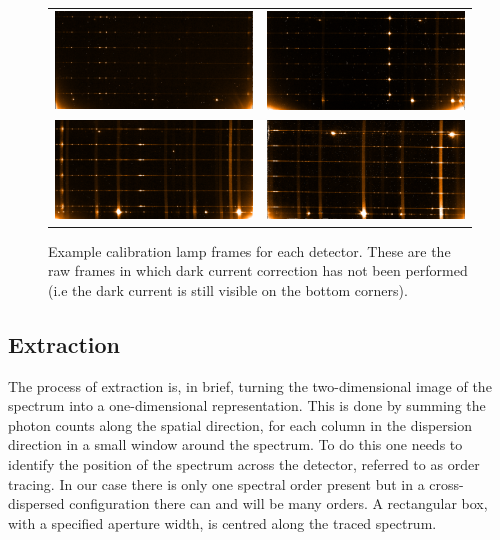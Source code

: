 \begin{figure}
    \begin{tabular}{cc}
         \includegraphics[width=.45\hsize]{./figures/reduction/Thar_1.png} & \includegraphics[width=.45\hsize]{./figures/reduction/Thar_2.png} \\
         \includegraphics[width=.45\hsize]{./figures/reduction/Thar_3.png} & \includegraphics[width=.45\hsize]{./figures/reduction/Thar_4.png} \\
    \end{tabular}

    \caption{Example \thar{} calibration lamp frames for each detector. These are the raw frames in which dark current correction has not been performed (i.e the dark current is still visible on the bottom corners).}
    \label{fig:caliblamps}
\end{figure}


\subsection{Extraction}
\label{subsec:extraction}
The process of extraction is, in brief, turning the two-dimensional image of the spectrum into a one-dimensional representation. This is done by summing the photon counts along the spatial direction, for each column in the dispersion direction in a small window around the spectrum. To do this one needs to identify the position of the spectrum across the detector, referred to as {order tracing}. In our case there is only one spectral order present but in a cross-dispersed configuration there can and will be many orders. A rectangular box, with a specified aperture width, is centred along the traced spectrum.

